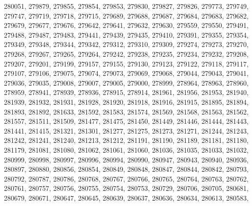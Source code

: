 \begin{appendix}
\begin{itemize}
     280051, 279879, 279855, 279854, 279853, 279830, 279827, 279826, 279773, 279749,\\
     279747, 279719, 279718, 279715, 279689, 279688, 279687, 279684, 279683, 279682,\\
     279679, 279677, 279676, 279642, 279641, 279632, 279630, 279559, 279550, 279491,\\
     279488, 279487, 279483, 279441, 279439, 279435, 279410, 279391, 279355, 279354,\\
     279349, 279348, 279344, 279342, 279312, 279310, 279309, 279274, 279273, 279270,\\
     279268, 279267, 279265, 279264, 279242, 279238, 279235, 279234, 279232, 279208,\\
     279207, 279201, 279199, 279157, 279155, 279130, 279123, 279122, 279118, 279117,\\
     279107, 279106, 279075, 279074, 279073, 279069, 279068, 279044, 279043, 279041,\\
     279036, 279035, 279008, 279007, 279005, 279000, 278999, 278964, 278963, 278960,\\
     278959, 278941, 278939, 278936, 278915, 278914, 281961, 281956, 281953, 281940,\\
     281939, 281932, 281931, 281928, 281920, 281918, 281916, 281915, 281895, 281894,\\
     281893, 281892, 281633, 281592, 281583, 281574, 281569, 281568, 281563, 281562,\\
     281557, 281511, 281509, 281477, 281475, 281450, 281449, 281446, 281444, 281443,\\
     281441, 281415, 281321, 281301, 281277, 281275, 281273, 281271, 281244, 281243,\\
     281242, 281241, 281240, 281213, 281212, 281191, 281190, 281189, 281181, 281180,\\
     281179, 281081, 281080, 281062, 281061, 281060, 281036, 281035, 281033, 281032,\\
     280999, 280998, 280997, 280996, 280994, 280990, 280947, 280943, 280940, 280936,\\
     280897, 280880, 280856, 280854, 280849, 280848, 280847, 280844, 280842, 280793,\\
     280792, 280787, 280786, 280768, 280767, 280766, 280765, 280764, 280763, 280762,\\
     280761, 280757, 280756, 280755, 280754, 280753, 280729, 280706, 280705, 280681,\\
     280679, 280671, 280647, 280645, 280639, 280637, 280636, 280634, 280613, 280583,\\

\end{itemize}
\end{appendix}
